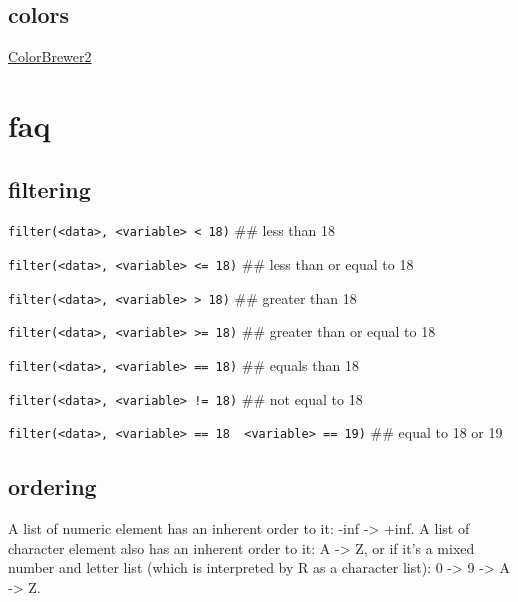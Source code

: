 \documentclass[
]{krantz}
\begin{document}
\hypertarget{colors}{%
\subsection{colors}\label{colors}}

\href{https://colorbrewer2.org/}{ColorBrewer2}

\hypertarget{faq}{%
\section{faq}\label{faq}}

\hypertarget{filtering}{%
\subsection{filtering}\label{filtering}}

\texttt{filter(\textless{}data\textgreater{},\ \textless{}variable\textgreater{}\ \textless{}\ 18)} \#\# less than 18

\texttt{filter(\textless{}data\textgreater{},\ \textless{}variable\textgreater{}\ \textless{}=\ 18)} \#\# less than or equal to 18

\texttt{filter(\textless{}data\textgreater{},\ \textless{}variable\textgreater{}\ \textgreater{}\ 18)} \#\# greater than 18

\texttt{filter(\textless{}data\textgreater{},\ \textless{}variable\textgreater{}\ \textgreater{}=\ 18)} \#\# greater than or equal to 18

\texttt{filter(\textless{}data\textgreater{},\ \textless{}variable\textgreater{}\ ==\ 18)} \#\# equals than 18

\texttt{filter(\textless{}data\textgreater{},\ \textless{}variable\textgreater{}\ !=\ 18)} \#\# not equal to 18

\texttt{filter(\textless{}data\textgreater{},\ \textless{}variable\textgreater{}\ ==\ 18\ \textbar{}\ \textless{}variable\textgreater{}\ ==\ 19)} \#\# equal to 18 or 19

\hypertarget{ordering}{%
\subsection{ordering}\label{ordering}}

A list of numeric element has an inherent order to it: -inf -\textgreater{} +inf. A list of character element also has an inherent order to it: A -\textgreater{} Z, or if it's a mixed number and letter list (which is interpreted by R as a character list): 0 -\textgreater{} 9 -\textgreater{} A -\textgreater{} Z.
\end{document}
